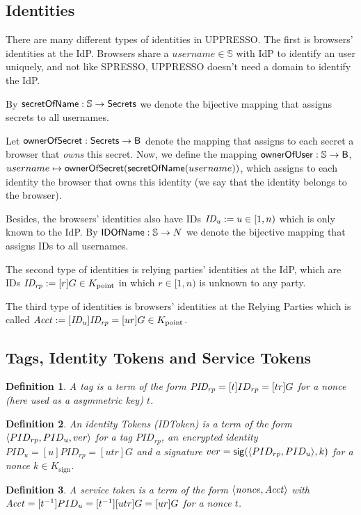 \documentclass[letterpaper,onecolumn,10pt]{article}
\newtheorem{definition}{Definition}
\begin{document}
\subsection{Identities}\label{app:uppresso-identities}
There are many different types of identities in UPPRESSO. 
The first is browsers' identities at the IdP. Browsers share
a $username\in\mathbb{S}$ with IdP to identify an user 
uniquely, and not like SPRESSO, UPPRESSO doesn't need a 
domain to identify the IdP.

By $\mathsf{secretOfName}:\mathbb{S} \to \mathsf{Secrets}$ we denote the bijective 
mapping that assigns secrets to all usernames. 

Let $\mathsf{ownerOfSecret}: \mathsf{Secrets} \to \mathsf{B}$ denote the 
mapping that assigns to each secret a browser that 
\emph{owns} this secret. Now, we define the mapping 
$\mathsf{ownerOfUser}: \mathbb{S} \to \mathsf{B}$, $username \mapsto
\mathsf{ownerOfSecret}(\mathsf{secretOfName}(username))$, which assigns to each 
identity the browser that owns this identity (we say that the 
identity belongs to the browser).

Besides, the browsers' identities also have IDs 
$\mathit{ID_u}:=u\in[1,n)$ which is only known to the IdP. By $\mathsf{IDOfName}:\mathbb{S} \to N$ we denote 
the bijective mapping that assigns IDs to all usernames. 

The second type of identities is relying parties' identities 
at the IdP, which are IDs 
$\mathit{ID_{rp}}:=[r]G \in K_{\text{point}}$ in which $r\in[1,n)$ 
is unknown to any party.

The third type of identities is browsers' identities at the
Relying Parties which is called $\mathit{Acct} := [\mathit{ID_u}]
\mathit{ID_{rp}} = [ur]G \in K_{\text{point}}$. 

\subsection{Tags, Identity Tokens and Service Tokens}\label{app:identity-assertions}

\begin{definition}\label{def:tag}
  A \emph{tag} is a term of the form $\mathit{PID_{rp}}=[t]ID_{rp}=[tr]G$ for a nonce 
  (here used as a asymmetric key) $t$.
\end{definition}
\begin{definition}
  An \emph{identity Tokens (IDToken)} is a term of the form 
  $\langle PID_{rp}, PID_u, ver\rangle$ for a tag $PID_{rp}$, an encrypted identity 
  $PID_u=[u]PID_{rp}=[utr]G$ and a signature $ver=\mathsf{sig}({\langle PID_{rp},PID_u\rangle},{k})$ 
  for a nonce $k\in K_{\text{sign}}$.
\end{definition}
\begin{definition}
  A \emph{service token} is a term of the form 
  $\langle {{}\mathit{nonce}, \mathit{Acct}} \rangle$ with 
  $\mathit{Acct} = [t^{-1}]PID_u=[t^{-1}][utr]G=[ur]G$ 
  for a nonce $t$.
\end{definition}
\end{document}
